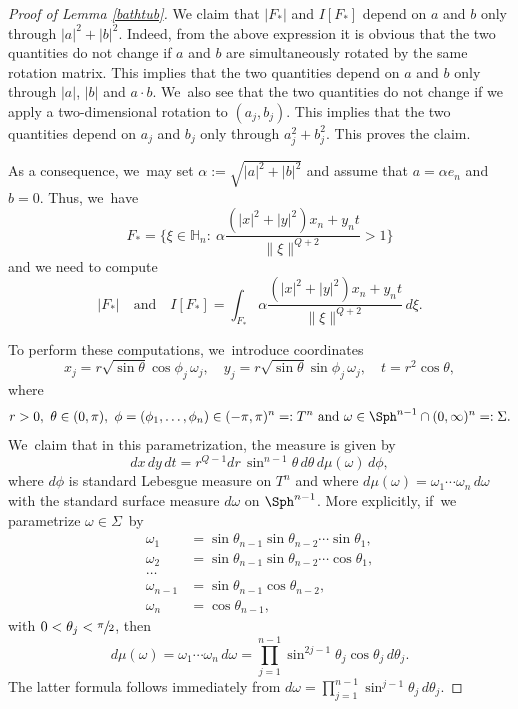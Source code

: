 \begin{proof}[Proof of Lemma \ref{bathtub}]
We claim that $|F_*|$ and $I[F_*]$ depend on $a$ and $b$ only through $|a|^2+|b|^2$. Indeed, from the above expression it is obvious that the two quantities do not change if $a$ and $b$ are simultaneously rotated by the same rotation matrix. This implies that the two quantities depend on $a$ and $b$ only through $|a|$, $|b|$ and $a\cdot b$. We~also see that the two quantities do not change if we apply a two-dimensional rotation to $(a_j,b_j)$. This implies that the two quantities depend on $a_j$ and $b_j$ only through $a_j^2+b_j^2$. This proves the claim.

As a consequence, we~may set $\alpha:=\sqrt{|a|^2+|b|^2}$ and assume that $a=\alpha e_n$ and $b=0$. Thus, we~have
\[
F_* = \Big\{ \xi \in\mathbb H_n:\ \alpha \frac{(|x|^2+|y|^2)x_n + y_n t}{\|\xi\|^{Q+2}} >1 \Big\}
\]
and we need to compute
\[
|F_*|
\quad\text{and}\quad
I[F_*] = \int_{F_*} \alpha \frac{(|x|^2+|y|^2)x_n + y_n t}{\|\xi\|^{Q+2}} \,d\xi.
\]

To perform these computations, we~introduce coordinates
\[
x_j = r \sqrt{\sin\theta} \cos\phi_j \,\omega_j,
\quad
y_j = r \sqrt{\sin\theta} \sin\phi_j \,\omega_j,
\quad
t = r^2 \cos\theta,
\]
where
\[
r>0,\ \theta\in(0,\pi),\ \phi=(\phi_1,\ldots,\phi_n)\in(-\pi,\pi)^n=:T^n \ \text{and}\ \omega \in\Sph^{n-1}\cap(0,\infty)^n=:\Sigma.
\]
We~claim that in this parametrization, the measure is given by
\begin{equation}
\label{eq:measure}
dx\,dy\,dt = r^{Q-1}dr\,\sin^{n-1}\theta\,d\theta\,d\mu(\omega)\,d\phi,
\end{equation}
where $d\phi$ is standard Lebesgue measure on $T^n$ and where $d\mu(\omega) = \omega_1\cdots\omega_n\,d\omega$ with the standard surface measure $d\omega$ on $\Sph^{n-1}$. More explicitly, if~we parametrize \hbox{$\omega\in\Sigma$}~by
\begin{align*}
\omega_1 & = \sin\theta_{n-1} \sin\theta_{n-2} \cdots \sin\theta_1,\\
\omega_2 & = \sin\theta_{n-1} \sin\theta_{n-2} \cdots \cos\theta_1,\\
\ldots \\
\omega_{n-1} & = \sin\theta_{n-1} \cos\theta_{n-2},\\
\omega_n & = \cos\theta_{n-1},
\end{align*}
with $0<\theta_j<\sfrac\pi 2$, then
\[
d\mu(\omega) = \omega_1\cdots\omega_n\,d\omega = \prod_{j=1}^{n-1} \sin^{2j-1} \theta_j\cos\theta_j\,d\theta_j.
\]
The latter formula follows immediately from $d\omega = \prod_{j=1}^{n-1} \sin^{j-1}\theta_j\,d\theta_j$.


\end{proof}
